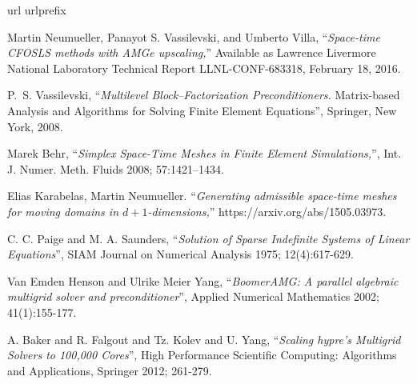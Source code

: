 \documentclass[a4paper,12pt]{amsart}
\numberwithin{equation}{section}
\begin{document}
\begin{thebibliography}{99}
\expandafter\ifx\csname url\endcsname\relax
  \def\url#1{\texttt{#1}}\fi
\expandafter\ifx\csname urlprefix\endcsname\relax\def\urlprefix{URL }\fi

Martin Neumueller, Panayot S. Vassilevski, and Umberto Villa,
``{\em Space-time CFOSLS methods with AMGe upscaling,}''
Available as Lawrence Livermore National Laboratory Technical Report LLNL-CONF-683318, February 18, 2016.


{\sc P.~S. Vassilevski,}
``{\em Multilevel Block--Factorization Preconditioners.} 
Matrix-based Analysis and Algorithms for Solving Finite Element Equations'',
Springer, New York, 2008.

Marek Behr, ``{\em Simplex Space-Time Meshes in Finite Element Simulations,}'',
Int. J. Numer. Meth. Fluids 2008; 57:1421–1434.

Elias Karabelas, Martin Neumueller. 
``{\em Generating admissible space-time meshes for moving domains in $d + 1$-dimensions,}''
https://arxiv.org/abs/1505.03973.


C. C. Paige and M. A. Saunders, ``{\em Solution of Sparse Indefinite Systems of Linear Equations}'',
SIAM Journal on Numerical Analysis 1975; 12(4):617-629.

Van Emden Henson and Ulrike Meier Yang, ``{\em Boomer{AMG}: A parallel algebraic multigrid solver and preconditioner}'',
Applied Numerical Mathematics 2002; 41(1):155-177.

A. Baker and R. Falgout and Tz. Kolev and U. Yang, ``{\em Scaling hypre's Multigrid Solvers to 100,000 Cores}'',
High Performance Scientific Computing: Algorithms and Applications, Springer 2012; 261-279.

\end{thebibliography}
\end{document}
